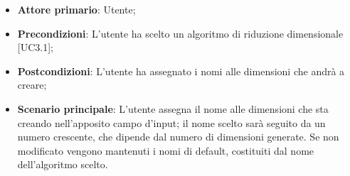\begin{itemize}
	\item \textbf{Attore primario}: Utente;
	
	\item \textbf{Precondizioni}: L'utente ha scelto un algoritmo di riduzione dimensionale [UC3.1];
	
	\item \textbf{Postcondizioni}: L'utente ha assegnato i nomi alle dimensioni che andrà a creare;
	
	\item \textbf{Scenario principale}: L'utente assegna il nome alle dimensioni che sta creando nell'apposito campo d'input; il nome scelto sarà seguito da un numero crescente, che dipende dal numero di dimensioni generate. Se non modificato vengono mantenuti i nomi di default, costituiti dal nome dell'algoritmo scelto.

\end{itemize}	
